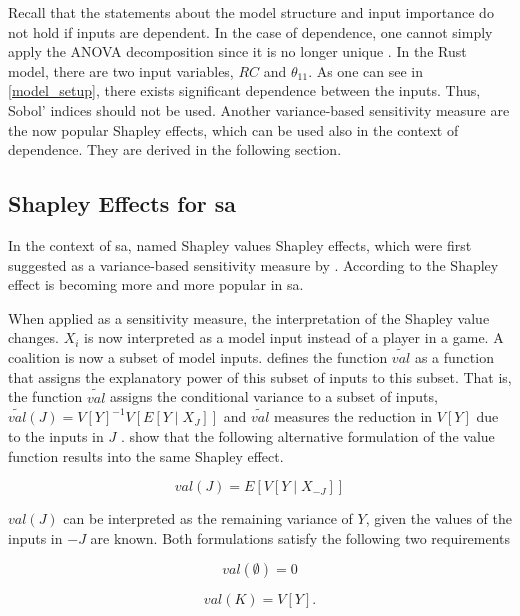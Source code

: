 Recall that the statements about the model structure and input importance do not hold if inputs are dependent. In the case of dependence, one cannot simply apply the ANOVA decomposition since it is no longer unique \citep{O14}. In the Rust model, there are two input variables, $RC$ and $\theta_{11}$. As one can see in \cref{model_setup}, there exists significant dependence between the inputs. Thus, Sobol' indices should not be used. Another variance-based sensitivity measure are the now popular Shapley effects, which can be used also in the context of dependence. They are derived in the following section.

\subsection{Shapley Effects for sa}

In the context of sa, \citet{SNS16} named Shapley values Shapley effects, which were first suggested as a variance-based sensitivity measure by \citet{O14}. According to \citet{PRB20} the Shapley effect is becoming more and more popular in sa.

When applied as a sensitivity measure, the interpretation of the Shapley value changes. $X_i$ is now interpreted as a model input instead of a player in a game. A coalition is now a subset of model inputs. \citet{O14} defines the function $\widetilde{val}$ as a function that assigns the explanatory power of this subset of inputs to this subset. That is, the function $\widetilde{val}$ assigns the conditional variance to a subset of inputs, $\widetilde{val}(J)=V[Y]^{-1}V[E[Y \mid X_J]]$ and $\widetilde{val}$ measures the reduction in $V[Y]$ due to the inputs in $J$ \citep{SNS16}. \citep{SNS16} show that the following alternative formulation of the value function results into the same Shapley effect.

\begin{equation}
val(J)=E[V[Y \mid X_{- J}]]
\end{equation}

$val(J)$ can be interpreted as the remaining variance of $Y$, given the values of the inputs in $- J$ are known. Both formulations satisfy the following two requirements

\begin{equation}
val(\emptyset) = 0
\end{equation}

\begin{equation}
val(K)=V[Y].
\end{equation}

